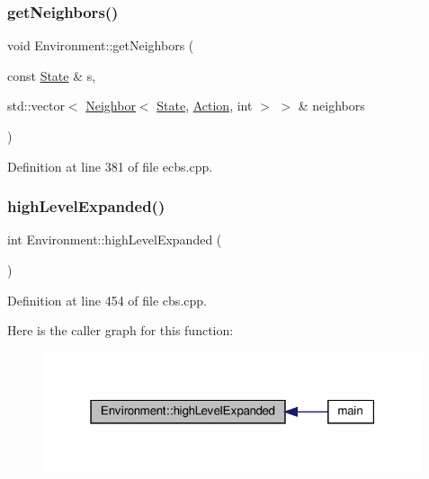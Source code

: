 \subsubsection{\texorpdfstring{get\+Neighbors()}{getNeighbors()}\hspace{0.1cm}{\footnotesize\ttfamily [4/4]}}
{\footnotesize\ttfamily void Environment\+::get\+Neighbors (\begin{DoxyParamCaption}\item[{const \hyperlink{struct_state}{State} \&}]{s,  }\item[{std\+::vector$<$ \hyperlink{structlib_multi_robot_planning_1_1_neighbor}{Neighbor}$<$ \hyperlink{struct_state}{State}, \hyperlink{a__star_8cpp_a8bb1ef53467e4f61410d12822d922498}{Action}, int $>$ $>$ \&}]{neighbors }\end{DoxyParamCaption})\hspace{0.3cm}{\ttfamily [inline]}}



Definition at line 381 of file ecbs.\+cpp.

\mbox{\label{class_environment_a117b88b2a1e0267cfe28d0a6545af72d}} 
\subsubsection{\texorpdfstring{high\+Level\+Expanded()}{highLevelExpanded()}\hspace{0.1cm}{\footnotesize\ttfamily [1/2]}}
{\footnotesize\ttfamily int Environment\+::high\+Level\+Expanded (\begin{DoxyParamCaption}{ }\end{DoxyParamCaption})\hspace{0.3cm}{\ttfamily [inline]}}



Definition at line 454 of file cbs.\+cpp.

Here is the caller graph for this function\+:
\nopagebreak
\begin{figure}[H]
\begin{center}
\leavevmode
\includegraphics[width=316pt]{class_environment_a117b88b2a1e0267cfe28d0a6545af72d_icgraph}
\end{center}
\end{figure}
\mbox{\label{class_environment_a117b88b2a1e0267cfe28d0a6545af72d}} 
